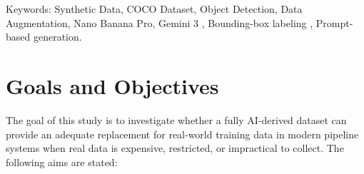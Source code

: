\documentclass[conference]{IEEEtran}
\begin{document}
\maketitle

\begin{abstract}


The rapid progress and adoption of modern computer vision have sparked global debates about AI’s real-world reliability. However, models still rely on large, well-annotated datasets, while collecting real-world data is still expensive, slow, and often restricted by legal or physical limits. Most of the existing work on synthetic data for images continues to focus on controlled settings or narrow category subsets, making it unclear whether fully AI-generated datasets can effectively train models when data is limited and conditions are highly constrained, especially with the recent shift toward newer generative AI models. The proposal will address this gap by constructing a COCO-like dataset generated using Nano Banana Pro (Gemini 3), matching the original 80 object classes used in the standard COCO benchmark, and will evaluate how well it serves as training data for object detection models. Our pipeline will generate diverse scenes with COCO-format annotations. This work will provide an evidence-based foundation for using AI-generated datasets to accelerate model development when collecting real labeled data is difficult.




\end{abstract}

\begin{IEEEkeywords}
Keywords: Synthetic Data, COCO Dataset, Object Detection, Data Augmentation, Nano Banana Pro, Gemini 3 , Bounding-box labeling , Prompt-based generation. 
\end{IEEEkeywords}


\section{Goals and Objectives}
The goal of this study is to investigate whether a fully AI-derived dataset can provide an adequate replacement for real-world training data in modern pipeline systems when real data is expensive, restricted, or impractical to collect. The following aims are stated:
\end{document}
